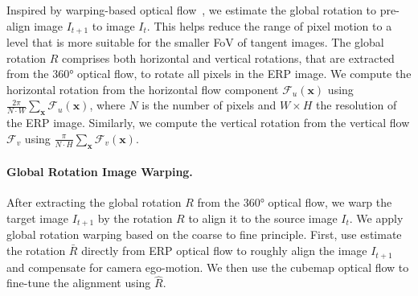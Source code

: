 Inspired by warping-based optical flow~\cite{BroxBPW2004}, we estimate the global rotation to pre-align image $I_{t+1}$ to image $I_{t}$.
This helps reduce the range of pixel motion to a level that is more suitable for the smaller FoV of tangent images.
%
The global rotation $R$ comprises both horizontal and vertical rotations, that are extracted from the 360° optical flow, to rotate all pixels in the ERP image.
%
We compute the horizontal rotation from the horizontal flow component $\mathcal{F}_u(\mathbf{x})$ using $\frac{2\pi}{N\cdot W}\sum_\mathbf{x}\mathcal{F}_u(\mathbf{x})$, where $N$ is the number of pixels and $W \!\times\! H$ the resolution of the ERP image.
%
Similarly, we compute the vertical rotation from the vertical flow $\mathcal{F}_v$ using $\frac{\pi}{N \cdot H}\sum_\mathbf{x}\mathcal{F}_v(\mathbf{x})$.


\paragraph{Global Rotation Image Warping.}
After extracting  the global rotation $R$ from the 360° optical flow, we warp the target image $I_{t+1}$ by the rotation $R$ to align it to the source image $I_{t}$. %
%
We apply global rotation warping based on the coarse to fine principle.
First, use estimate the rotation $\bar{R}$ directly from ERP optical flow to roughly align the image $I_{t+1}$ and compensate for camera ego-motion.
We then use the cubemap optical flow to fine-tune the alignment using $\hat{R}$.


